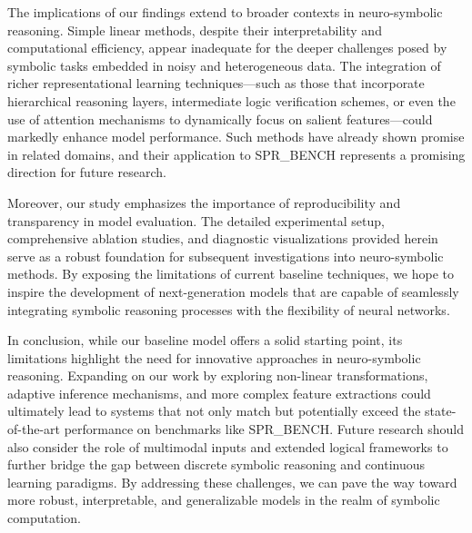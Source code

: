 \documentclass{article}
\begin{document}
The implications of our findings extend to broader contexts in neuro-symbolic reasoning. Simple linear methods, despite their interpretability and computational efficiency, appear inadequate for the deeper challenges posed by symbolic tasks embedded in noisy and heterogeneous data. The integration of richer representational learning techniques—such as those that incorporate hierarchical reasoning layers, intermediate logic verification schemes, or even the use of attention mechanisms to dynamically focus on salient features—could markedly enhance model performance. Such methods have already shown promise in related domains, and their application to SPR\_BENCH represents a promising direction for future research.

Moreover, our study emphasizes the importance of reproducibility and transparency in model evaluation. The detailed experimental setup, comprehensive ablation studies, and diagnostic visualizations provided herein serve as a robust foundation for subsequent investigations into neuro-symbolic methods. By exposing the limitations of current baseline techniques, we hope to inspire the development of next-generation models that are capable of seamlessly integrating symbolic reasoning processes with the flexibility of neural networks.

In conclusion, while our baseline model offers a solid starting point, its limitations highlight the need for innovative approaches in neuro-symbolic reasoning. Expanding on our work by exploring non-linear transformations, adaptive inference mechanisms, and more complex feature extractions could ultimately lead to systems that not only match but potentially exceed the state-of-the-art performance on benchmarks like SPR\_BENCH. Future research should also consider the role of multimodal inputs and extended logical frameworks to further bridge the gap between discrete symbolic reasoning and continuous learning paradigms. By addressing these challenges, we can pave the way toward more robust, interpretable, and generalizable models in the realm of symbolic computation.
\end{document}
